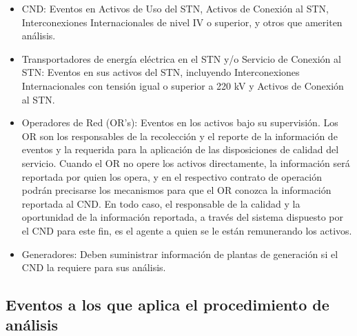 \documentclass[a5paper]{book}%
\begin{document}
\begin{itemize}
	
	\item CND: Eventos en Activos de Uso del STN, Activos de Conexión al STN, Interconexiones Internacionales de nivel IV o superior, y otros que ameriten análisis.
	
	\item Transportadores de energía eléctrica en el \ac{STN} y/o Servicio de Conexión al \ac{STN}: Eventos en sus activos del \ac{STN}, incluyendo Interconexiones Internacionales con tensión igual o superior a 220 kV y Activos de Conexión al \ac{STN}.
	
	\item Operadores de Red (OR's): Eventos en los activos bajo su supervisión. Los OR son los responsables de la recolección y el reporte de la información de eventos y la requerida para la aplicación de las disposiciones de calidad del servicio. Cuando el OR no opere los activos directamente, la información será reportada por quien los opera, y en el respectivo contrato de operación podrán precisarse los mecanismos para que el OR conozca la información reportada al CND. En todo caso, el responsable de la calidad y la oportunidad de la información reportada, a través del sistema dispuesto por el CND para este fin, es el agente a quien se le están remunerando los activos.
	
	\item Generadores: Deben suministrar información de plantas de generación si el \ac{CND} la requiere para sus análisis.
	
\end{itemize}



\subsection{Eventos a los que aplica el procedimiento de análisis}
\end{document}
